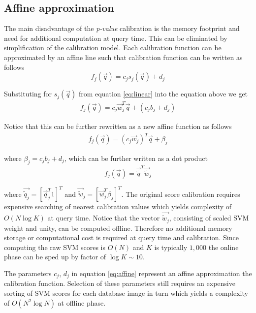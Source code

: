    \subsection{Affine approximation}
     The main disadvantage of the \emph{p-value} calibration is the memory footprint and need for additional computation at query time. This can be eliminated by simplification of the calibration model. Each calibration function can be approximated by an affine line such that calibration function can be written as follows
     \begin{equation}
       f_j(\vec{q}) = c_j s_j(\vec{q}) + d_j
       \label{eq:affine}
     \end{equation}

     \noindent
     Substituting for $s_j(\vec{q})$ from equation \eqref{eq:linear} into the equation above we get
     \begin{align}
        \nonumber
         f_j(\vec{q}) = c_j\vec{w}_j^T \vec{q}+ (c_j b_j+d_j)
    \end{align}

    Notice that this can be further rewritten as a new affine function as follows
    \begin{align}
      \nonumber
        f_j(\vec{q}) = (c_j\vec{w}_j)^T \vec{q} + \beta_j
     \end{align}

    \noindent
    where $\beta_j=c_j b_j+d_j$, which can be further written as a  dot product
    \begin{equation}
      f_j(\vec{q}) = \vec{\widetilde{q}}^T \vec{\widetilde{w}}_j
      \label{eq:affiine3}
    \end{equation}
     
     \noindent
     where $\vec{\tilde{q}_j}=[\vec{q}_j^T 1]^T$ and $\vec{\widetilde{w}}_j = [\vec{w}_j^T \beta_j]^T$. The original score calibration requires expensive searching of nearest calibration values which yields complexity of $O(N \log{K} )$ at query time. Notice that the vector $\vec{\tilde{w}_j}$, consisting of scaled SVM weight and unity, can be computed offline. Therefore no additional memory storage or computational cost is required at query time and calibration. Since computing the raw SVM scores is $O(N)$ and $K$ is typically $1,000$ the online phase can be sped up by factor of $\log{K}\sim 10$.

      The parameters $c_j$, $d_j$ in equation \eqref{eq:affine} represent an affine approximation the calibration function. Selection of these parameters still requires an expensive sorting of SVM scores for each database image in turn which yields a complexity of $O(N^2 \log{N})$ at offline phase.

